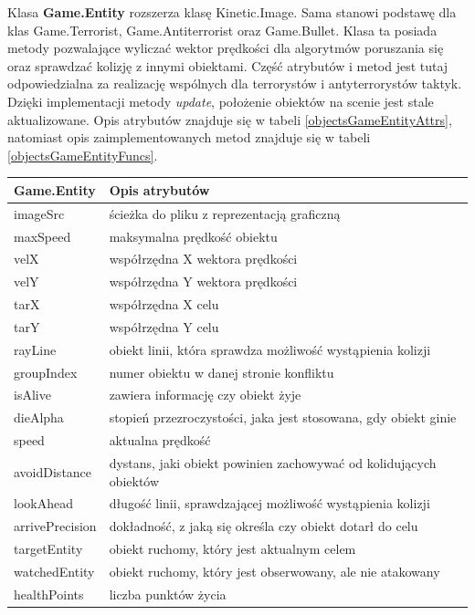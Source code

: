 Klasa \textbf{Game.Entity} rozszerza klasę Kinetic.Image. Sama stanowi podstawę dla klas Game.Terrorist, Game.Antiterrorist oraz Game.Bullet. Klasa ta posiada metody pozwalające wyliczać wektor prędkości dla algorytmów poruszania się oraz sprawdzać kolizję z innymi obiektami. Część atrybutów i metod jest tutaj odpowiedzialna za realizację wspólnych dla terrorystów i antyterrorystów taktyk. Dzięki implementacji metody \emph{update}, położenie obiektów na scenie jest stale aktualizowane. Opis atrybutów znajduje się w tabeli \ref{objectsGameEntityAttrs}, natomiast opis zaimplementowanych metod znajduje się w tabeli \ref{objectsGameEntityFuncs}. 

\begin{table}[p]
\begin{center}
\begin{tabular}{|p{}|p{}|}
\hline
\textbf{Game.Entity} & Opis atrybutów\\\hline		
    imageSrc & ścieżka do pliku z reprezentacją graficzną\\
    maxSpeed & maksymalna prędkość obiektu\\
    velX & współrzędna X wektora prędkości\\
    velY & współrzędna Y wektora prędkości\\
    tarX & współrzędna X celu\\
    tarY & współrzędna Y celu\\
    rayLine & obiekt linii, która sprawdza możliwość wystąpienia kolizji\\
    groupIndex & numer obiektu w danej stronie konfliktu\\
    isAlive & zawiera informację czy obiekt żyje\\
    dieAlpha & stopień przezroczystości, jaka jest stosowana, gdy obiekt ginie\\
    speed & aktualna prędkość\\
    avoidDistance & dystans, jaki obiekt powinien zachowywać od kolidujących obiektów\\
    lookAhead & długość linii, sprawdzającej możliwość wystąpienia kolizji\\
    arrivePrecision & dokładność, z jaką się określa czy obiekt dotarł do celu\\
    targetEntity & obiekt ruchomy, który jest aktualnym celem\\
    watchedEntity & obiekt ruchomy, który jest obserwowany, ale nie atakowany\\
    healthPoints & liczba punktów życia\\

\end{tabular}
\end{center}
\end{table}
